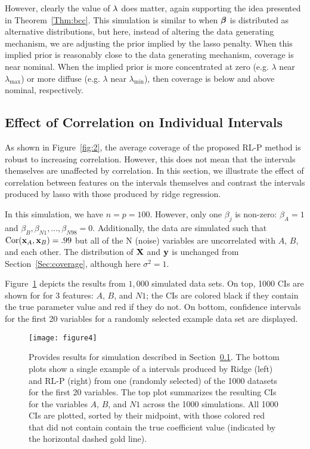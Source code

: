 However, clearly the value of $\lambda$ does matter, again supporting the idea presented in Theorem~\ref{Thm:bcc}. This simulation is similar to when $\boldsymbol{\beta}$ is distributed as alternative distributions, but here, instead of altering the data generating mechanism, we are adjusting the prior implied by the lasso penalty. When this implied prior is reasonably close to the data generating mechanism, coverage is near nominal. When the implied prior is more concentrated at zero (e.g. $\lambda$ near $\lambda_{\max}$) or more diffuse (e.g. $\lambda$ near $\lambda_{\min}$), then coverage is below and above nominal, respectively.

\subsection{Effect of Correlation on Individual Intervals} \label{Sec:Ridge}

As shown in Figure~\ref{fig:2}, the average coverage of the proposed RL-P method is robust to increasing correlation. However, this does not mean that the intervals themselves are unaffected by correlation. In this section, we illustrate the effect of correlation between features on the intervals themselves and contrast the intervals produced by lasso with those produced by ridge regression.

In this simulation, we have $n = p = 100$. However, only one $\beta_j$ is non-zero: $\beta_{A} = 1$ and $\beta_{B}, \beta_{N1}, \ldots, \beta_{N98} = 0$. Additionally, the data are simulated such that $\textrm{Cor}(\mathbf{x}_{A}, \mathbf{x}_{B}) = .99$ but all of the N (noise) variables are uncorrelated with $A$, $B$, and each other. The distribution of $\mathbf{X}$ and $\mathbf{y}$ is unchanged from Section~\ref{Sec:coverage}, although here $\sigma^2 = 1$.

Figure~\ref{fig:4} depicts the results from $1,000$ simulated data sets. On top, 1000 CIs are shown for for 3 features: $A$, $B$, and $N1$; the CIs are colored black if they contain the true parameter value and red if they do not. On bottom, confidence intervals for the first 20 variables for a randomly selected example data set are displayed.

\begin{figure}[htb!]
  \begin{center}
    \texttt{[image: figure4]}
    \caption{\label{fig:4}
      Provides results for simulation described in Section~\ref{Sec:Ridge}. The bottom plots show a single example of a intervals produced by Ridge (left) and RL-P (right) from one (randomly selected) of the 1000 datasets for the first 20 variables. The top plot summarizes the resulting CIs for the variables $A$, $B$, and $N1$ across the 1000 simulations. All 1000 CIs are plotted, sorted by their midpoint, with those colored red that did not contain contain the true coefficient value (indicated by the horizontal dashed gold line).
    }
  \end{center}
\end{figure}

